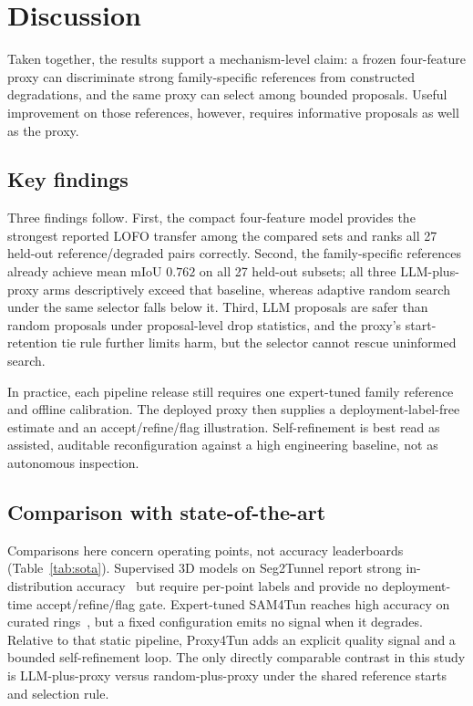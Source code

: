 \documentclass[a4paper,fleqn]{cas-dc}
\begin{document}
{%
\section{Discussion}\label{sec:discussion}

Taken together, the results support a mechanism-level claim: a frozen four-feature proxy can discriminate strong family-specific references from constructed degradations, and the same proxy can select among bounded proposals. Useful improvement on those references, however, requires informative proposals as well as the proxy.

\subsection{Key findings}

Three findings follow. First, the compact four-feature model provides the strongest reported LOFO transfer among the compared sets and ranks all 27 held-out reference/degraded pairs correctly. Second, the family-specific references already achieve mean mIoU $0.762$ on all 27 held-out subsets; all three LLM-plus-proxy arms descriptively exceed that baseline, whereas adaptive random search under the same selector falls below it. Third, LLM proposals are safer than random proposals under proposal-level drop statistics, and the proxy's start-retention tie rule further limits harm, but the selector cannot rescue uninformed search.

In practice, each pipeline release still requires one expert-tuned family reference and offline calibration. The deployed proxy then supplies a deployment-label-free estimate and an accept/refine/flag illustration. Self-refinement is best read as assisted, auditable reconfiguration against a high engineering baseline, not as autonomous inspection.

\subsection{Comparison with state-of-the-art}\label{sec:positioning}

Comparisons here concern operating points, not accuracy leaderboards (Table~\ref{tab:sota}). Supervised 3D models on Seg2Tunnel report strong in-distribution accuracy~\cite{lin2024seg2tunnel} but require per-point labels and provide no deployment-time accept/refine/flag gate. Expert-tuned SAM4Tun reaches high accuracy on curated rings~\cite{ye2025sam4tun}, but a fixed configuration emits no signal when it degrades. Relative to that static pipeline, Proxy4Tun adds an explicit quality signal and a bounded self-refinement loop. The only directly comparable contrast in this study is LLM-plus-proxy versus random-plus-proxy under the shared reference starts and selection rule.

}
\end{document}
